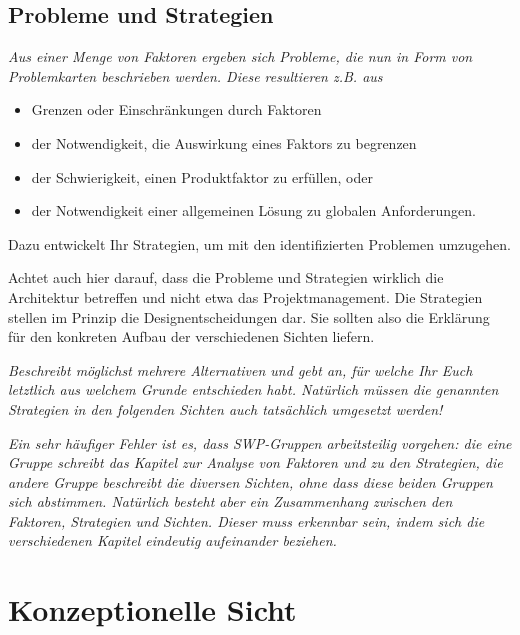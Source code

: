 \documentclass[fontsize=12pt,paper=a4,twoside]{scrartcl}
\begin{document}
\subsection{Probleme und Strategien}
\label{sec:strategien}

{\it Aus einer Menge von Faktoren ergeben sich Probleme, die nun in
  Form von Problemkarten beschrieben werden. Diese resultieren
  z.B. aus
  \begin{itemize}
  \item Grenzen oder Einschränkungen durch Faktoren
  \item der Notwendigkeit, die Auswirkung eines Faktors zu begrenzen
  \item der Schwierigkeit, einen Produktfaktor zu erfüllen, oder
  \item der Notwendigkeit einer allgemeinen Lösung zu globalen
    Anforderungen.
  \end{itemize}
  Dazu entwickelt Ihr Strategien, um mit den identifizierten Problemen
  umzugehen.

  Achtet auch hier darauf, dass die Probleme und Strategien wirklich
  die Architektur betreffen und nicht etwa das Projektmanagement. Die
  Strategien stellen im Prinzip die Designentscheidungen dar. Sie
  sollten also die Erklärung für den konkreten Aufbau der
  verschiedenen Sichten liefern.}


\textit{Beschreibt möglichst mehrere Alternativen und gebt
  an, für welche Ihr Euch letztlich aus welchem Grunde entschieden
  habt. Natürlich müssen die genannten Strategien in den folgenden
  Sichten auch tatsächlich umgesetzt werden!}

\textit{Ein sehr häufiger Fehler ist es, dass SWP-Gruppen
  arbeitsteilig vorgehen: die eine Gruppe schreibt das Kapitel zur
  Analyse von Faktoren und zu den Strategien, die andere Gruppe
  beschreibt die diversen Sichten, ohne dass diese beiden Gruppen sich
  abstimmen. Natürlich besteht aber ein Zusammenhang zwischen den
  Faktoren, Strategien und Sichten. Dieser muss erkennbar sein, indem
  sich die verschiedenen Kapitel eindeutig aufeinander beziehen.}

\section{Konzeptionelle Sicht}
\label{sec:konzeptionell}
\end{document}
